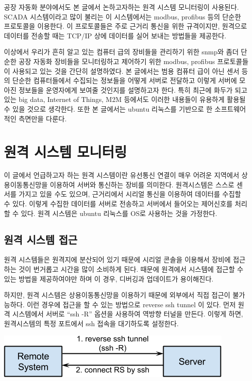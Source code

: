 \documentclass[letterpaper,10pt,english]{sphinxmanual}
\begin{document}
공장 자동화 분야에서도 본 글에서 논하고자하는 원격 시스템 모니터링이 사용된다. SCADA 시스템이라고 많이 불리는 이 시스템에서는 modbus, profibus 등의 단순한 프로토콜을 이용한다. 이 프로토콜들은 주로 근거리 통신을 위한 규격이지만,
원격으로 데이터를 전송할 때는 TCP/IP 상에 데이터를 실어 보내는 방법들을 제공한다.

이상에서 우리가 흔히 알고 있는 컴퓨터 급의 장비들을 관리하기 위한 snmp와
좀더 단순한 공장 자동화 장비들을 모니터링하고 제어하기 위한 modbus,
profibus 프로토콜들이 사용되고 있는 것을 간단히 설명하였다. 본 글에서는
범용 컴퓨터 급이 아닌 센서 등의 단순한 컴퓨터들에서 수집되는 정보들을
어떻게 서버로 전달하고 이렇게 서버에 모아진 정보들을 운영자에게 보여줄
것인지를 설명하고자 한다. 특히 최근에 화두가 되고 있는 big data, Internet
of Things, M2M 등에서도 이러한 내용들이 유용하게 활용될 수 있을 것으로
생각한다.
또한 본 글에서는 ubuntu 리눅스를 기반으로 한 소프트웨어적인 측면만을 다룬다.


\chapter{원격 시스템 모니터링}
\label{monitoring::doc}\label{monitoring:id1}
이 글에서 언급하고자 하는 원격 시스템이란 유선통신 연결이 매우 어려운 지역에서 상용이동통신망을 이용하여 서버와 통신하는 장비를 의미한다. 원격시스템은 스스로 센서를 가지고 있을 수도 있으며, 근거리에서 시리얼 통신을 이용하여 데이터를 수집할 수 있다. 이렇게 수집한 데이터를 서버로 전송하고 서버에서 들어오는 제어신호를 처리할 수 있다. 원격 시스템은 ubuntu 리눅스를 OS로 사용하는 것을 가정한다.


\section{원격 시스템 접근}
\label{monitoring:id2}
원격 시스템들은 원격지에 분산되어 있기 때문에 시리얼 콘솔을 이용해서 장비에 접근하는 것이 번거롭고 시간을 많이 소비하게 된다. 때문에 원격에서 시스템에 접근할 수 있는 방법을 제공하여야만 하며 이 경우, 디버깅과 업데이트가 용이해진다.

하지만, 원격 시스템은 상용이동통신망을 이용하기 때문에 외부에서 직접 접근이 불가능하다. 이런 경우에 접근을 할 수 있는 방법으로 reverse ssh tunnel 이 있다. 먼저 원격 시스템에서 서버로 “ssh -R” 옵션을 사용하여 역방향 터널을 만든다. 이렇게 하면, 원격시스템의 특정 포트에서 ssh 접속을 대기하도록 설정한다.

\includegraphics{ssh.png}
\end{document}
